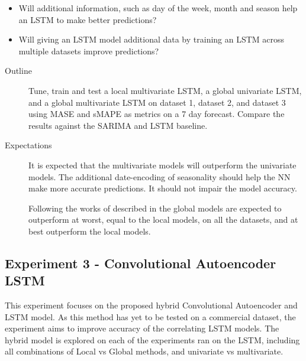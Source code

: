 \begin{itemize}
  \item {Will additional information, such as day of the week, month and season help an LSTM to make better predictions?}
  \item {Will giving an LSTM model additional data by training an LSTM across multiple datasets improve predictions?}
\end{itemize}

\begin{description}
  \item[Outline]{
              Tune, train and test a local multivariate LSTM, a global univariate LSTM,
              and a global multivariate LSTM on dataset 1,
              dataset 2, and dataset 3 using MASE and sMAPE as metrics on a 7 day forecast.
              Compare the results against the SARIMA and LSTM baseline.
        }
\end{description}

\begin{description}
  \item[Expectations]{
              It is expected that the multivariate models will outperform the univariate models.
              The additional date-encoding of seasonality should help the NN make more accurate predictions.
              It should not impair the model accuracy.

              Following the works of \cite{Montero-Manso2021} described in 
              the global models are expected to outperform at worst, equal to the local models, on all the datasets, and at best outperform the local models.

        }
\end{description}

\subsection{Experiment 3 - Convolutional Autoencoder LSTM}
This experiment focuses on the proposed hybrid Convolutional Autoencoder and LSTM model.
As this method has yet to be tested on a commercial dataset,
the experiment aims to improve accuracy of the correlating LSTM models.
The hybrid model is explored on each of the experiments ran on the LSTM,
including all combinations of Local vs Global methods, and univariate vs multivariate.

